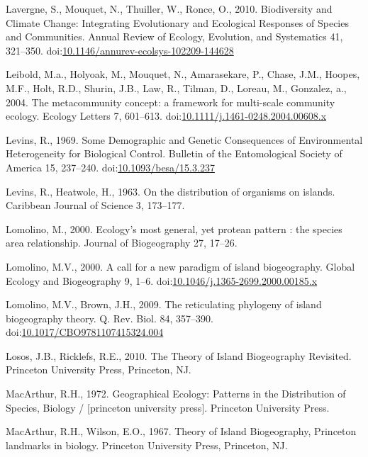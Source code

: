\hypertarget{ref-Lavergne2010}{}
Lavergne, S., Mouquet, N., Thuiller, W., Ronce, O., 2010. Biodiversity
and Climate Change: Integrating Evolutionary and Ecological Responses of
Species and Communities. Annual Review of Ecology, Evolution, and
Systematics 41, 321--350.
doi:\href{https://doi.org/10.1146/annurev-ecolsys-102209-144628}{10.1146/annurev-ecolsys-102209-144628}

\hypertarget{ref-Leibold2004}{}
Leibold, M.a., Holyoak, M., Mouquet, N., Amarasekare, P., Chase, J.M.,
Hoopes, M.F., Holt, R.D., Shurin, J.B., Law, R., Tilman, D., Loreau, M.,
Gonzalez, a., 2004. The metacommunity concept: a framework for
multi-scale community ecology. Ecology Letters 7, 601--613.
doi:\href{https://doi.org/10.1111/j.1461-0248.2004.00608.x}{10.1111/j.1461-0248.2004.00608.x}

\hypertarget{ref-Levins1969}{}
Levins, R., 1969. Some Demographic and Genetic Consequences of
Environmental Heterogeneity for Biological Control. Bulletin of the
Entomological Society of America 15, 237--240.
doi:\href{https://doi.org/10.1093/besa/15.3.237}{10.1093/besa/15.3.237}

\hypertarget{ref-Levins1963}{}
Levins, R., Heatwole, H., 1963. On the distribution of organisms on
islands. Caribbean Journal of Science 3, 173--177.

\hypertarget{ref-Lomolino2000a}{}
Lomolino, M., 2000. Ecology's most general, yet protean pattern : the
species area relationship. Journal of Biogeography 27, 17--26.

\hypertarget{ref-Lomolino2000}{}
Lomolino, M.V., 2000. A call for a new paradigm of island biogeography.
Global Ecology and Biogeography 9, 1--6.
doi:\href{https://doi.org/10.1046/j.1365-2699.2000.00185.x}{10.1046/j.1365-2699.2000.00185.x}

\hypertarget{ref-Lomolino2009}{}
Lomolino, M.V., Brown, J.H., 2009. The reticulating phylogeny of island
biogeography theory. Q. Rev. Biol. 84, 357--390.
doi:\href{https://doi.org/10.1017/CBO9781107415324.004}{10.1017/CBO9781107415324.004}

\hypertarget{ref-Losos2010}{}
Losos, J.B., Ricklefs, R.E., 2010. The Theory of Island Biogeography
Revisited. Princeton University Press, Princeton, NJ.

\hypertarget{ref-macarthur1972geographical}{}
MacArthur, R.H., 1972. Geographical Ecology: Patterns in the
Distribution of Species, Biology / {[}princeton university press{]}.
Princeton University Press.

\hypertarget{ref-MacArthur1967}{}
MacArthur, R.H., Wilson, E.O., 1967. Theory of Island Biogeography,
Princeton landmarks in biology. Princeton University Press, Princeton,
NJ.


